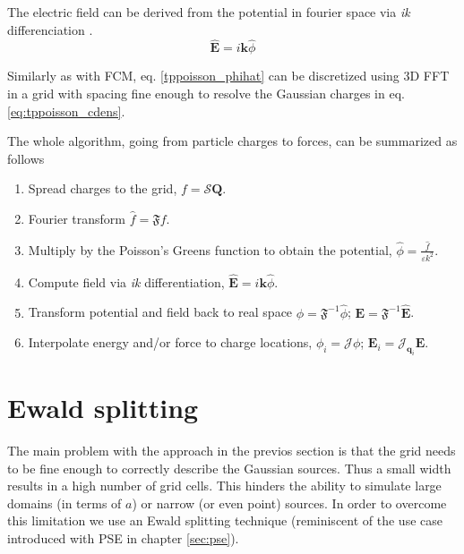 \documentclass[ twoside,openright,titlepage,numbers=noenddot,%
headinclude,footinclude,cleardoublepage=empty,abstract=on,
BCOR=5mm,paper=a4,fontsize=11pt, dvipsnames
]{scrreprt}
\renewcommand{\vec}[1]{\bm{#1}}
\newcommand{\oper}[1]{\mathcal{#1}}
\newcommand{\fou}[1]{\widehat{#1}}
\newcommand{\ppos}{q}
\begin{document}
The electric field can be derived from the potential in fourier space via \emph{ik} differenciation \cite{ikdiff}.
\begin{equation}
    \label{tppoisson_ehat}
  \hat{\vec{E}} = i\vec{k}\hat{\phi}
\end{equation}

Similarly as with \gls{FCM}, eq. \eqref{tppoisson_phihat} can be discretized using 3D \gls{FFT} in a grid with spacing fine enough to resolve the Gaussian charges in eq. \eqref{eq:tppoisson_cdens}.

The whole algorithm, going from particle charges to forces, can be summarized as follows
\begin{enumerate}
\item Spread charges to the grid, $f=\oper{S}\vec{Q}$.
\item Fourier transform $\hat{f} = \mathfrak{F}f$.
\item Multiply by the Poisson's Greens function to obtain the potential, $\fou{\phi} = \frac{\hat{f}}{\varepsilon k^2}$.
\item Compute field via \emph{ik} differentiation, $\fou{\vec{E}} = i\vec{k}\fou\phi$.
\item Transform potential and field back to real space $\phi = \mathfrak{F}^{-1}\fou\phi$; $\vec{E} = \mathfrak{F}^{-1}\fou{\vec{E}}$.
\item Interpolate energy and/or force to charge locations, $\phi_i = \oper{J}\phi$; $\vec{E}_i = \oper{J}_{\vec{\ppos}_i}\vec{E}$.
\end{enumerate}
\section{Ewald splitting}\label{sec:tppoisson_ewald}
The main problem with the approach in the previos section is that the grid needs to be fine enough to correctly describe the Gaussian sources. Thus a small width results in a high number of grid cells. This hinders the ability to simulate large domains (in terms of $a$) or narrow (or even point) sources. In order to overcome this limitation we use an Ewald splitting technique\cite{Tornberg2015} (reminiscent of the use case introduced with \gls{PSE} in chapter \ref{sec:pse}).
\end{document}
